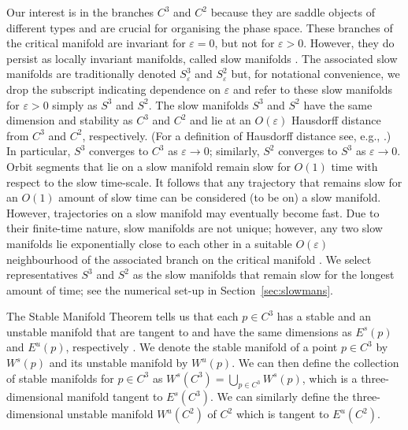 \documentclass{ws-ijbc}
\begin{document}
Our interest is in the branches $C^3$ and $C^2$ because they are saddle objects of different types and are crucial for organising the phase space.  These branches of the critical manifold are invariant for $\varepsilon = 0$, but not for $\varepsilon > 0$.  However, they do persist as locally invariant manifolds, called slow manifolds \cite{Fenichel}.  The associated slow manifolds are traditionally denoted $S^3_\varepsilon$ and $S^2_\varepsilon$ but, for notational convenience, we drop the subscript indicating dependence on $\varepsilon$ and refer to these slow manifolds for $\varepsilon > 0$ simply as $S^3$ and $S^2$.  The slow manifolds $S^3$ and $S^2$ have the same dimension and stability as $C^3$ and $C^2$ and lie at an $O(\varepsilon)$ Hausdorff distance from $C^3$ and $C^2$, respectively.  (For a definition of Hausdorff distance see, e.g., \cite{Hausdorff_Distance}.)  In particular, $S^3$ converges to $C^3$ as $\varepsilon \rightarrow 0$;  similarly, $S^2$ converges to $S^3$ as $\varepsilon \rightarrow 0$.  Orbit segments that lie on a slow manifold remain slow for $O(1)$ time with respect to the slow time-scale.  It follows that any trajectory that remains slow for an $O(1)$ amount of slow time can be considered (to be on) a slow manifold.  However, trajectories on a slow manifold may eventually become fast. Due to their finite-time nature, slow manifolds are not unique; however, any two slow manifolds lie exponentially close to each other in a suitable $O(\varepsilon)$ neighbourhood of the associated branch on the critical manifold \cite{Fenichel}.  We select representatives $S^3$ and $S^2$ as the slow manifolds that remain slow for the longest amount of time; see the numerical set-up in Section~\ref{sec:slowmans}.

The Stable Manifold Theorem tells us that each $p \in C^3$ has a stable and an unstable manifold that are tangent to and have the same dimensions as $E^{s}(p)$ and $E^{u}(p)$, respectively \cite{PdM, Perko_book}.  We denote the stable manifold of a point $p \in C^3$ by $W^{s}(p)$ and its unstable manifold by $W^{u}(p)$.  We can then define the collection of stable manifolds for $p \in C^3$ as $W^{s}(C^3) = \bigcup_{p \in C^3} W^{s}(p)$, which is a three-dimensional manifold tangent to $E^s(C^3)$.  We can similarly define the three-dimensional unstable manifold $W^{u}(C^2)$ of $C^2$ which is tangent to $E^u(C^2)$.
\end{document}
